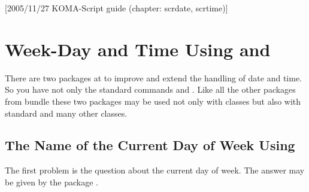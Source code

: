 %
%
%
%
%
%
%
%

[{2005/11/27 KOMA-Script guide (chapter:
  scrdate, scrtime)}]

\chapter{Week-Day and Time Using  and }

There are two packages at \KOMAScript{} to improve and extend the
handling of date and time. So you have not
only the standard commands  and . Like all
the other packages from \KOMAScript{} bundle these two packages may be used
not only with \KOMAScript{} classes but also with standard and many
other classes.

\section{The Name of the Current Day of Week Using }
\label{sec:sec:datetime.scrdate}

The first problem is the question about the current day of week. The answer
may be given by the package .

